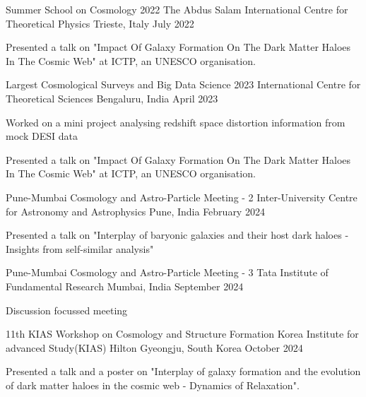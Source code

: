 {}

\begin{cventries}

{
\cventry
{Summer School on Cosmology 2022}
{The Abdus Salam International Centre for Theoretical Physics}
{Trieste, Italy}
{July 2022}
{
\begin{cvitems}
\item {Presented a talk on "Impact Of Galaxy Formation On The Dark Matter Haloes In The Cosmic Web" at ICTP, an UNESCO organisation.}
\end{cvitems}
}
}

{
\cventry
{Largest Cosmological Surveys and Big Data Science 2023}
{International Centre for Theoretical Sciences}
{Bengaluru, India}
{April 2023}
{
\begin{cvitems}
\item {Worked on a mini project analysing redshift space distortion information from mock DESI data}
\item {Presented a talk on "Impact Of Galaxy Formation On The Dark Matter Haloes In The Cosmic Web" at ICTP, an UNESCO organisation.}
\end{cvitems}
}
}


{
\cventry
{Pune-Mumbai Cosmology and Astro-Particle Meeting - 2}
{Inter-University Centre for Astronomy and Astrophysics}
{Pune, India}
{February 2024}
{
\begin{cvitems}
\item {Presented a talk on "Interplay of baryonic galaxies and their host dark haloes - Insights from self-similar analysis"}
\end{cvitems}
}
}

{
\cventry
{Pune-Mumbai Cosmology and Astro-Particle Meeting - 3}
{Tata Institute of Fundamental Research}
{Mumbai, India}
{September 2024}
{
\begin{cvitems}
\item {Discussion focussed meeting}
\end{cvitems}
}
}

{
\cventry
{11th KIAS Workshop on Cosmology and Structure Formation}
{Korea Institute for advanced Study(KIAS)}
{Hilton Gyeongju, South Korea}
{October 2024}
{
\begin{cvitems}
\item {Presented a talk and a poster on "Interplay of galaxy formation and the evolution of dark matter haloes in the cosmic web - Dynamics of Relaxation".}
\end{cvitems}
}
}


\end{cventries}
